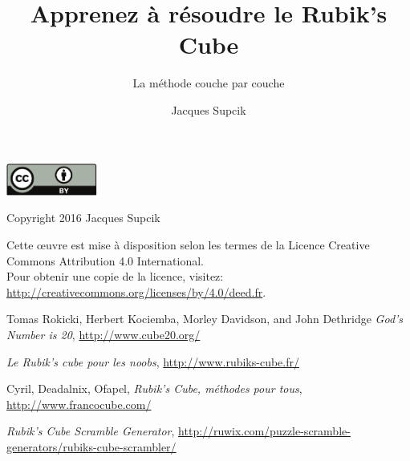 \documentclass[10pt,paper=a5,pagesize]{scrbook}
\author{Jacques Supcik}
\title{Apprenez à résoudre le Rubik's Cube}
\subtitle{La méthode \og couche par couche\fg}
\begin{document}
\maketitle
\thispagestyle{empty}
\par\vspace*{\fill}
\includegraphics[width=30mm]{by.pdf}

Copyright \textcopyright{} 2016 Jacques Supcik

Cette œuvre est mise à disposition selon les termes de la Licence Creative Commons Attribution 4.0 International.
\medskip\\
Pour obtenir une copie de la licence, visitez:\\
\url{http://creativecommons.org/licenses/by/4.0/deed.fr}.
\newpage

\tableofcontents




% 
% 



\begin{thebibliography}{9}
	
	 Tomas Rokicki, Herbert Kociemba, Morley Davidson, and John Dethridge
	\emph{God's Number is 20},
	\url{http://www.cube20.org/}

	\emph{Le Rubik's cube pour les noobs},
	\url{http://www.rubiks-cube.fr/}

	Cyril, Deadalnix, Ofapel,
	\emph{Rubik's Cube, méthodes pour tous},
	\url{http://www.francocube.com/}
	
	\emph{Rubik’s Cube Scramble Generator},
	\url{http://ruwix.com/puzzle-scramble-generators/rubiks-cube-scrambler/}
	
	
\end{thebibliography}
\end{document}
